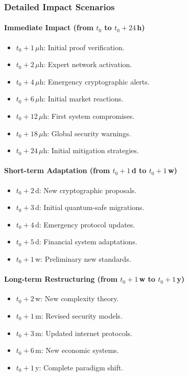 \documentclass[11pt]{article}
\begin{document}
\subsubsection{Detailed Impact Scenarios}

\paragraph{Immediate Impact (from $t_0$ to $t_0+24\,$h)}
\begin{itemize}
    \item $t_0+1\,\mu\text{h}$: Initial proof verification.
    \item $t_0+2\,\mu\text{h}$: Expert network activation.
    \item $t_0+4\,\mu\text{h}$: Emergency cryptographic alerts.
    \item $t_0+6\,\mu\text{h}$: Initial market reactions.
    \item $t_0+12\,\mu\text{h}$: First system compromises.
    \item $t_0+18\,\mu\text{h}$: Global security warnings.
    \item $t_0+24\,\mu\text{h}$: Initial mitigation strategies.
\end{itemize}

\paragraph{Short-term Adaptation \quad (from $t_0+1\,$d to $t_0+1\,$w)}
\begin{itemize}
    \item $t_0+2\,$d: New cryptographic proposals.
    \item $t_0+3\,$d: Initial quantum-safe migrations.
    \item $t_0+4\,$d: Emergency protocol updates.
    \item $t_0+5\,$d: Financial system adaptations.
    \item $t_0+1\,$w: Preliminary new standards.
\end{itemize}

\paragraph{Long-term Restructuring \quad (from $t_0+1\,$w to $t_0+1\,$y)}
\begin{itemize}
    \item $t_0+2\,$w: New complexity theory.
    \item $t_0+1\,$m: Revised security models.
    \item $t_0+3\,$m: Updated internet protocols.
    \item $t_0+6\,$m: New economic systems.
    \item $t_0+1\,$y: Complete paradigm shift.
\end{itemize}
\end{document}
